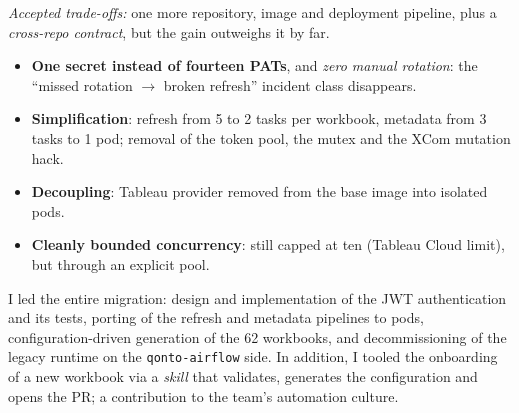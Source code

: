 \emph{Accepted trade-offs:} one more repository, image and deployment pipeline, plus a \emph{cross-repo contract}, but the gain outweighs it by far.

\begin{keybox}
\begin{itemize}
  \item \textbf{One secret instead of fourteen PATs}, and \emph{zero manual rotation}: the ``missed rotation $\rightarrow$ broken refresh'' incident class disappears.
  \item \textbf{Simplification}: refresh from 5 to 2 tasks per workbook, metadata from 3 tasks to 1 pod; removal of the token pool, the mutex and the XCom mutation hack.
  \item \textbf{Decoupling}: Tableau provider removed from the base image into isolated pods.
  \item \textbf{Cleanly bounded concurrency}: still capped at ten (Tableau Cloud limit), but through an explicit pool.
\end{itemize}
\end{keybox}

\begin{contribbox}
I led the entire migration: design and implementation of the JWT authentication and its tests, porting of the refresh and metadata pipelines to pods, configuration-driven generation of the 62 workbooks, and decommissioning of the legacy runtime on the \texttt{qonto-airflow} side. In addition, I tooled the onboarding of a new workbook via a \emph{skill} that validates, generates the configuration and opens the PR; a contribution to the team's automation culture.
\end{contribbox}
